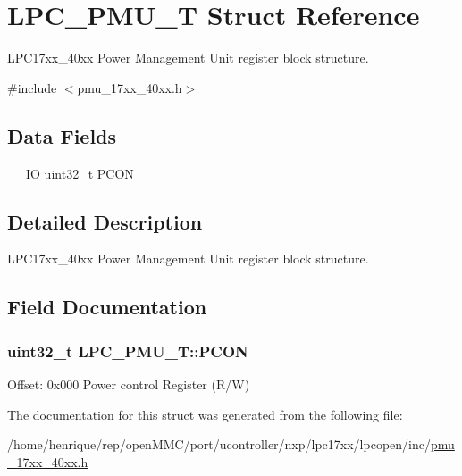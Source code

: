 \hypertarget{structLPC__PMU__T}{\section{L\-P\-C\-\_\-\-P\-M\-U\-\_\-\-T Struct Reference}
\label{structLPC__PMU__T}
}


L\-P\-C17xx\-\_\-40xx Power Management Unit register block structure.  




{\ttfamily \#include $<$pmu\-\_\-17xx\-\_\-40xx.\-h$>$}

\subsection*{Data Fields}
\begin{DoxyCompactItemize}
\item 
\hyperlink{core__cm3_8h_aec43007d9998a0a0e01faede4133d6be}{\-\_\-\-\_\-\-I\-O} uint32\-\_\-t \hyperlink{structLPC__PMU__T_a9b889ba60e56c881274ac9eaebecaf66}{P\-C\-O\-N}
\end{DoxyCompactItemize}


\subsection{Detailed Description}
L\-P\-C17xx\-\_\-40xx Power Management Unit register block structure. 

\subsection{Field Documentation}
\hypertarget{structLPC__PMU__T_a9b889ba60e56c881274ac9eaebecaf66}{
\subsubsection[{P\-C\-O\-N}]{ uint32\-\_\-t L\-P\-C\-\_\-\-P\-M\-U\-\_\-\-T\-::\-P\-C\-O\-N}}\label{structLPC__PMU__T_a9b889ba60e56c881274ac9eaebecaf66}
Offset\-: 0x000 Power control Register (R/\-W) 

The documentation for this struct was generated from the following file\-:\begin{DoxyCompactItemize}
\item 
/home/henrique/rep/open\-M\-M\-C/port/ucontroller/nxp/lpc17xx/lpcopen/inc/\hyperlink{pmu__17xx__40xx_8h}{pmu\-\_\-17xx\-\_\-40xx.\-h}\end{DoxyCompactItemize}
